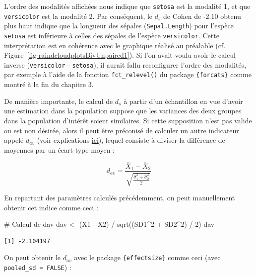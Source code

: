 \documentclass[
  letterpaper,
]{book}
\newenvironment{Shaded}{\begin{snugshade}}{\end{snugshade}}
\newcommand{\CommentTok}[1]{\textcolor[rgb]{0.37,0.37,0.37}{#1}}
\newcommand{\DecValTok}[1]{\textcolor[rgb]{0.68,0.00,0.00}{#1}}
\newcommand{\FunctionTok}[1]{\textcolor[rgb]{0.28,0.35,0.67}{#1}}
\newcommand{\NormalTok}[1]{\textcolor[rgb]{0.00,0.23,0.31}{#1}}
\newcommand{\OtherTok}[1]{\textcolor[rgb]{0.00,0.23,0.31}{#1}}
\newcommand{\SpecialCharTok}[1]{\textcolor[rgb]{0.37,0.37,0.37}{#1}}
\begin{document}
L'ordre des modalités affichées nous indique que \texttt{setosa} est la
modalité 1, et que \texttt{versicolor} est la modalité 2. Par
conséquent, le \(d_{s}\) de Cohen de -2.10 obtenu plus haut indique que
la longueur des sépales (\texttt{Sepal.Length}) pour l'espèce
\texttt{setosa} est inférieure à celles des sépales de l'espèce
\texttt{versicolor}. Cette interprétation est en cohérence avec le
graphique réalisé au préalable (cf.
Figure~\ref{fig-raindcloudplotsBivUnpaired1}). Si l'on avait voulu avoir
le calcul inverse (\texttt{versicolor} - \texttt{setosa}), il aurait
fallu reconfigurer l'ordre des modalités, par exemple à l'aide de la
fonction \texttt{fct\_relevel()} du package \texttt{\{forcats\}} comme
montré à la fin du chapitre 3.

De manière importante, le calcul de \(d_s\) à partir d'un échantillon en
vue d'avoir une estimation dans la population suppose que les variances
des deux groupes dans la population d'intérêt soient similaires. Si
cette supposition n'est pas valide ou est non désirée, alors il peut
être préconisé de calculer un autre indicateur appelé \(d_{av}\) (voir
explications
\href{https://aaroncaldwell.us/TOSTERpkg/articles/SMD_calcs.html}{ici}),
lequel consiste à diviser la différence de moyennes par un écart-type
moyen :

\[d_{av} = \frac{\overline{X}_{1} - \overline{X}_{2}} {\sqrt{\frac{\hat{\sigma}_{1}^2 + \hat{\sigma}_{2}^2} {2}}}\]

En repartant des paramètres calculés précédemment, on peut manuellement
obtenir cet indice comme ceci :

\begin{Shaded}
\begin{Highlighting}[]
\CommentTok{\# Calcul de dav}
\NormalTok{dav }\OtherTok{\textless{}{-}}\NormalTok{ (X1 }\SpecialCharTok{{-}}\NormalTok{ X2) }\SpecialCharTok{/} \FunctionTok{sqrt}\NormalTok{((SD1}\SpecialCharTok{\^{}}\DecValTok{2} \SpecialCharTok{+}\NormalTok{ SD2}\SpecialCharTok{\^{}}\DecValTok{2}\NormalTok{) }\SpecialCharTok{/} \DecValTok{2}\NormalTok{)}
\NormalTok{dav}
\end{Highlighting}
\end{Shaded}

\begin{verbatim}
[1] -2.104197
\end{verbatim}

On peut obtenir le \(d_{av}\) avec le package \texttt{\{effectsize\}}
comme ceci (avec \texttt{pooled\_sd\ =\ FALSE}) :
\end{document}

